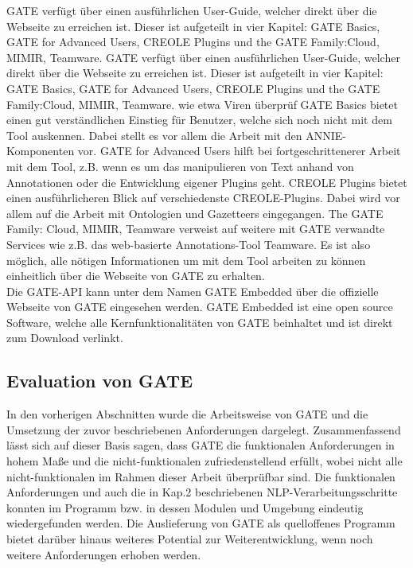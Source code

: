 \documentclass[12pt]{report}
\begin{document}
GATE verfügt über einen ausführlichen User-Guide, welcher direkt über die Webseite zu erreichen ist. Dieser ist aufgeteilt in vier Kapitel: GATE Basics, GATE for Advanced Users, CREOLE Plugins und the GATE Family:Cloud, MIMIR, Teamware. 
GATE verfügt über einen ausführlichen User-Guide, welcher direkt über die Webseite zu erreichen ist. Dieser ist aufgeteilt in vier Kapitel: GATE Basics, GATE for Advanced Users, CREOLE Plugins und the GATE Family:Cloud, MIMIR, Teamware. wie etwa Viren überprüf
GATE Basics bietet einen gut verständlichen Einstieg für Benutzer, welche sich noch nicht mit dem Tool auskennen. Dabei stellt es vor allem die Arbeit mit den ANNIE-Komponenten vor.
GATE for Advanced Users hilft bei fortgeschrittenerer Arbeit mit dem Tool, z.B. wenn es um das manipulieren von Text anhand von Annotationen oder die Entwicklung eigener Plugins geht.
CREOLE Plugins bietet einen ausführlicheren Blick auf verschiedenste CREOLE-Plugins. Dabei wird vor allem auf die Arbeit mit Ontologien und Gazetteers eingegangen.
The GATE Family: Cloud, MIMIR, Teamware verweist auf weitere mit GATE verwandte Services wie z.B. das web-basierte Annotations-Tool Teamware.
Es ist also möglich, alle nötigen Informationen um mit dem Tool arbeiten zu können einheitlich über die Webseite von GATE zu erhalten. \\

Die GATE-API kann unter dem Namen GATE Embedded über die offizielle Webseite von GATE eingesehen werden. GATE Embedded ist eine open source Software, welche alle Kernfunktionalitäten von GATE beinhaltet und ist direkt zum Download verlinkt. 
 
\subsection{Evaluation von GATE}
In den vorherigen Abschnitten wurde die Arbeitsweise von GATE und die Umsetzung der zuvor beschriebenen Anforderungen dargelegt. Zusammenfassend lässt sich auf dieser Basis sagen, dass GATE die funktionalen Anforderungen in hohem Maße und die nicht-funktionalen zufriedenstellend erfüllt, wobei nicht alle nicht-funktionalen im Rahmen dieser Arbeit überprüfbar sind. Die funktionalen Anforderungen und auch die in Kap.2 beschriebenen NLP-Verarbeitungsschritte konnten im Programm bzw. in dessen Modulen und Umgebung eindeutig wiedergefunden werden. Die Auslieferung von GATE als quelloffenes Programm bietet darüber hinaus weiteres Potential zur Weiterentwicklung, wenn noch weitere Anforderungen erhoben werden.
\end{document}
